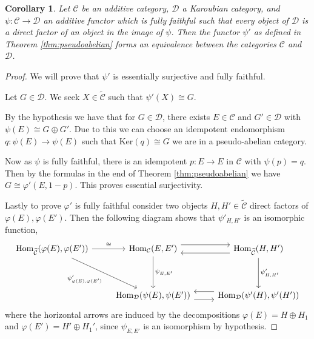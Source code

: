 \documentclass[12pt]{report}
\numberwithin{equation}{section}
\newcommand{\Hom}{{\mathrm{Hom}}}
\newtheorem{corollary}[dummy]{Corollary}
\begin{document}
	\begin{corollary}\label{thm:equivpseudoabelian}
		Let $\mathcal{C}$ be an additive category, $\mathcal{D}$ a Karoubian category, and $\psi: \mathcal{C} \to \mathcal{D}$ an additive functor which is fully faithful such that every object of $\mathcal{D}$ is a direct factor of an object in the image of $\psi$. Then the functor $\psi'$ as defined in Theorem \ref{thm:pseudoabelian} forms an equivalence between the categories $\mathcal{C}$ and $\mathcal{D}$.
	\end{corollary}
	\begin{proof}
		We will prove that $\psi'$ is essentially surjective and fully faithful. 
		
		Let $G \in \mathcal{D}$. We seek $X \in \widetilde{\mathcal{C}}$ such that $\psi'(X) \cong G$.
		
		By the hypothesis we have that for $G \in \mathcal{D}$, there exists $E \in \mathcal{C}$ and $G' \in \mathcal{D}$ with $\psi(E) \cong G \oplus G'$.
		Due to this we can choose an idempotent endomorphism $q: \psi(E) \to \psi(E)$ such that $\text{Ker}(q) \cong G$ we are in a pseudo-abelian category.
		
		Now as $\psi$ is fully faithful, there is an idempotent $p: E \to E$ in $\mathcal{C}$ with $\psi(p) = q$. Then by the formulas in the end of Theorem \ref{thm:pseudoabelian} we have $G \cong \varphi' (E,1-p).$ This proves essential surjectivity.
		
		Lastly to prove $\varphi'$ is fully faithful consider two objects $H, H' \in \widetilde{\mathcal{C}}$ direct factors of $\varphi(E), \varphi(E')$. Then the following diagram shows that $\psi'_{H,H'} $ is an isomorphic function,
		\[\begin{tikzcd}
			{\Hom_{\widetilde{\mathcal{C}}}( \varphi(E), \varphi(E'))} & {\Hom_{\mathcal{C} }(E,E')} & {\Hom_{\widetilde{\mathcal{C}}}(H,H')} \\
			\\
			& {\Hom_\mathcal{D} (\psi(E), \psi(E'))} & {\Hom_\mathcal{D}(\psi'(H), \psi'(H'))}
			\arrow["{\cong }", from=1-1, to=1-2]
			\arrow["{\psi'_{\varphi(E), \varphi(E')}}"', from=1-1, to=3-2]
			\arrow[shift left=2, from=1-2, to=1-3]
			\arrow["{\psi_{E,E'}}", from=1-2, to=3-2]
			\arrow[shift left=2, from=1-3, to=1-2]
			\arrow["{\psi'_{H,H'}}", from=1-3, to=3-3]
			\arrow[shift right=2, from=3-2, to=3-3]
			\arrow[shift right=2, from=3-3, to=3-2]
		\end{tikzcd}\]
		where the horizontal arrows are induced by the decompositions $\varphi(E)=H \oplus H_1$ and $\varphi(E')=H' \oplus H_1'$, since $\psi_{E,E'} $ is an isomorphism by hypothesis.
	\end{proof}
	
\end{document}
